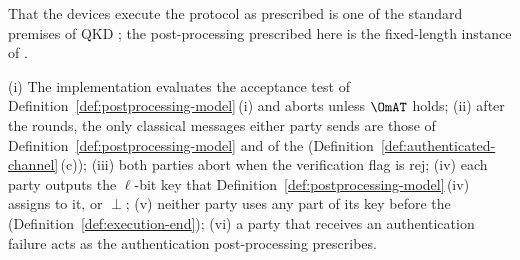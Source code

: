 
That the devices execute the protocol as prescribed is one of the standard
premises of QKD \cite[Sec.~IV.A]{portmann2022security}; the post-processing
prescribed here is the fixed-length instance of
\cite[Sec.~4.1, Protocol~1]{tupkary2026decoy}.

\begin{assumption}\label{ass:conform}
(i) The implementation evaluates the acceptance test of
Definition~\ref{def:postprocessing-model}\,(i) and aborts unless $\OmAT$
holds;
(ii) after the rounds, the only classical messages either party sends are
those of Definition~\ref{def:postprocessing-model} and of the
(Definition~\ref{def:authenticated-channel}\,(c));
(iii) both parties abort when the verification flag is $\mathrm{rej}$;
(iv) each party outputs the $\ell$-bit key that
Definition~\ref{def:postprocessing-model}\,(iv) assigns to it, or $\perp$;
(v) neither party uses any part of its key before the
 (Definition~\ref{def:execution-end});
(vi) a party that receives an authentication failure acts as the
authentication post-processing prescribes.
\end{assumption}
